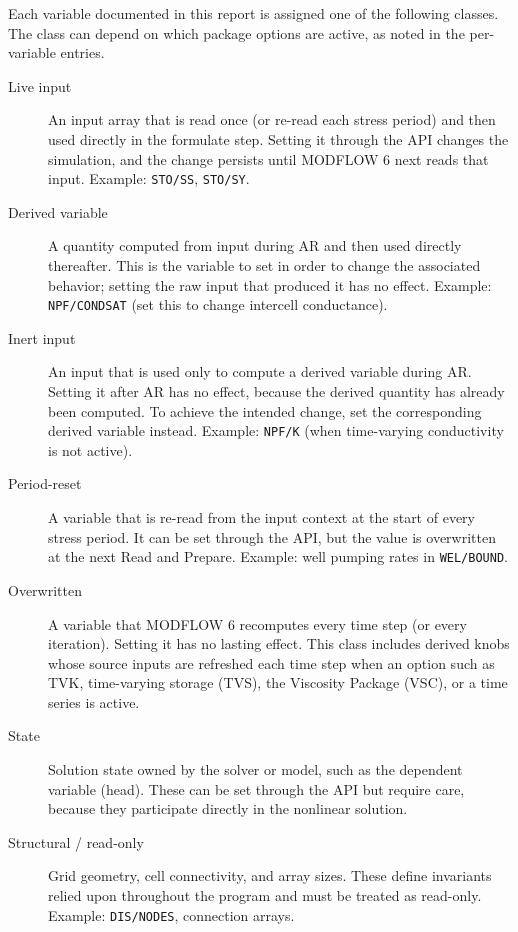 Each variable documented in this report is assigned one of the following
classes. The class can depend on which package options are active, as noted in
the per-variable entries.

\begin{description}
\item[Live input] An input array that is read once (or re-read each stress
period) and then used directly in the formulate step. Setting it through the API
changes the simulation, and the change persists until MODFLOW 6 next reads that
input. Example: \texttt{STO/SS}, \texttt{STO/SY}.

\item[Derived variable] A quantity computed from input during AR and then used
directly thereafter. This is the variable to set in order to change the
associated behavior; setting the raw input that produced it has no effect.
Example: \texttt{NPF/CONDSAT} (set this to change intercell conductance).

\item[Inert input] An input that is used only to compute a derived variable
during AR. Setting it after AR has no effect, because the derived quantity has
already been computed. To achieve the intended change, set the corresponding
derived variable instead. Example: \texttt{NPF/K} (when time-varying
conductivity is not active).

\item[Period-reset] A variable that is re-read from the input context at the
start of every stress period. It can be set through the API, but the value is
overwritten at the next Read and Prepare. Example: well pumping rates in
\texttt{WEL/BOUND}.

\item[Overwritten] A variable that MODFLOW 6 recomputes every time step (or
every iteration). Setting it has no lasting effect. This class includes derived
knobs whose source inputs are refreshed each time step when an option such as
TVK, time-varying storage (TVS), the Viscosity Package (VSC), or a time series
is active.

\item[State] Solution state owned by the solver or model, such as the dependent
variable (head). These can be set through the API but require care, because they
participate directly in the nonlinear solution.

\item[Structural / read-only] Grid geometry, cell connectivity, and array sizes.
These define invariants relied upon throughout the program and must be treated
as read-only. Example: \texttt{DIS/NODES}, connection arrays.
\end{description}

